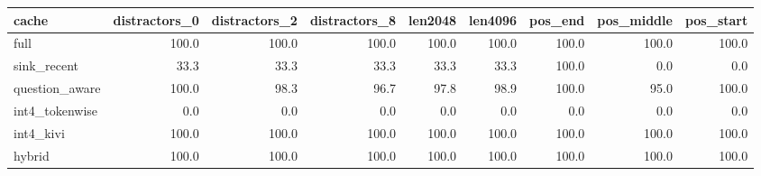 \begin{tabular}{lrrrrrrrr}
\toprule
cache & distractors\_0 & distractors\_2 & distractors\_8 & len2048 & len4096 & pos\_end & pos\_middle & pos\_start \\
\midrule
full & 100.0 & 100.0 & 100.0 & 100.0 & 100.0 & 100.0 & 100.0 & 100.0 \\
sink\_recent & 33.3 & 33.3 & 33.3 & 33.3 & 33.3 & 100.0 & 0.0 & 0.0 \\
question\_aware & 100.0 & 98.3 & 96.7 & 97.8 & 98.9 & 100.0 & 95.0 & 100.0 \\
int4\_tokenwise & 0.0 & 0.0 & 0.0 & 0.0 & 0.0 & 0.0 & 0.0 & 0.0 \\
int4\_kivi & 100.0 & 100.0 & 100.0 & 100.0 & 100.0 & 100.0 & 100.0 & 100.0 \\
hybrid & 100.0 & 100.0 & 100.0 & 100.0 & 100.0 & 100.0 & 100.0 & 100.0 \\
\bottomrule
\end{tabular}
